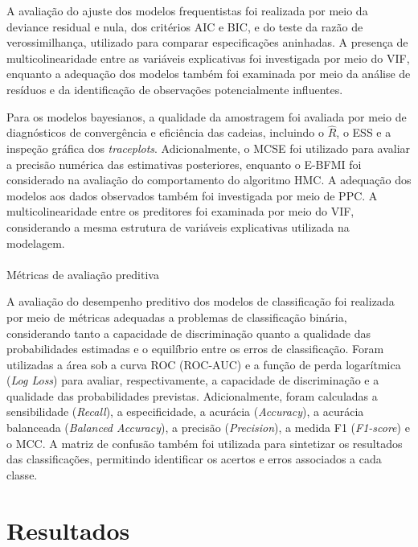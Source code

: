 \documentclass[
  brazilian,
  12pt,
  letterpaper,
  DIV=11,
  numbers=noendperiod]{scrartcl}
\makeatletter
\let\oldparagraph\paragraph
\renewcommand{\paragraph}{
    \@ifstar
      \xxxParagraphStar
      \xxxParagraphNoStar
  }
\newcommand{\xxxParagraphStar}[1]{\oldparagraph*{#1}\mbox{}}
\newcommand{\xxxParagraphNoStar}[1]{\oldparagraph{#1}\mbox{}}
\makeatother
\begin{document}
A avaliação do ajuste dos modelos frequentistas foi realizada por meio
da deviance residual e nula, dos critérios AIC e BIC, e do teste da
razão de verossimilhança, utilizado para comparar especificações
aninhadas. A presença de multicolinearidade entre as variáveis
explicativas foi investigada por meio do VIF, enquanto a adequação dos
modelos também foi examinada por meio da análise de resíduos e da
identificação de observações potencialmente influentes.

Para os modelos bayesianos, a qualidade da amostragem foi avaliada por
meio de diagnósticos de convergência e eficiência das cadeias, incluindo
o \(\hat{R}\), o ESS e a inspeção gráfica dos \emph{traceplots}.
Adicionalmente, o MCSE foi utilizado para avaliar a precisão numérica
das estimativas posteriores, enquanto o E-BFMI foi considerado na
avaliação do comportamento do algoritmo HMC. A adequação dos modelos aos
dados observados também foi investigada por meio de PPC. A
multicolinearidade entre os preditores foi examinada por meio do VIF,
considerando a mesma estrutura de variáveis explicativas utilizada na
modelagem.

\paragraph{Métricas de avaliação
preditiva}\label{muxe9tricas-de-avaliauxe7uxe3o-preditiva}

A avaliação do desempenho preditivo dos modelos de classificação foi
realizada por meio de métricas adequadas a problemas de classificação
binária, considerando tanto a capacidade de discriminação quanto a
qualidade das probabilidades estimadas e o equilíbrio entre os erros de
classificação. Foram utilizadas a área sob a curva ROC (ROC-AUC) e a
função de perda logarítmica (\emph{Log Loss}) para avaliar,
respectivamente, a capacidade de discriminação e a qualidade das
probabilidades previstas. Adicionalmente, foram calculadas a
sensibilidade (\emph{Recall}), a especificidade, a acurácia
(\emph{Accuracy}), a acurácia balanceada (\emph{Balanced Accuracy}), a
precisão (\emph{Precision}), a medida F1 (\emph{F1-score}) e o MCC. A
matriz de confusão também foi utilizada para sintetizar os resultados
das classificações, permitindo identificar os acertos e erros associados
a cada classe.

\section{Resultados}\label{resultados}
\end{document}
